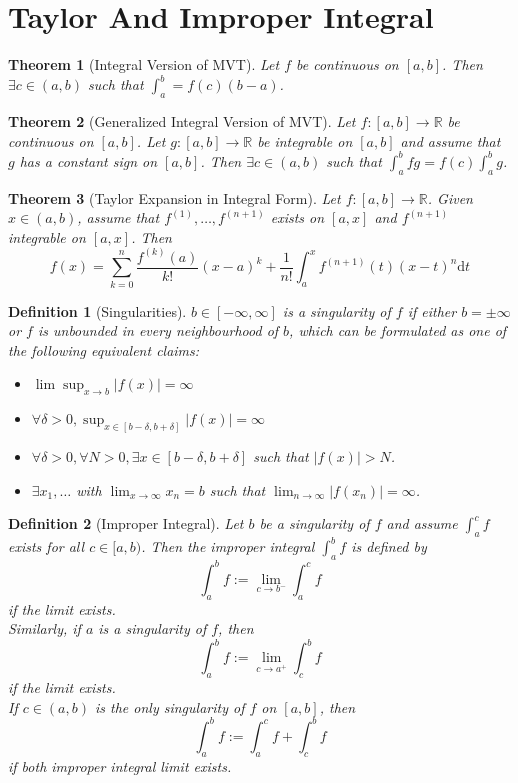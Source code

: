 \documentclass[12pt]{article}
\newcommand{\diff}{\mathrm{d}}
\newtheorem{definition}{Definition}[section]
\newtheorem{theorem}{Theorem}[section]
\theoremstyle{definition}
\begin{document}
\section{Taylor And Improper Integral}
\begin{theorem}[Integral Version of MVT]
\normalfont Let $f$ be continuous on $[a,b]$. Then $\exists c\in(a,b)$ such that $\int_a^b = f(c)(b-a)$.
\end{theorem}
\begin{theorem}[Generalized Integral Version of MVT]
\normalfont Let $f:[a,b]\to\mathbb{R}$ be continuous on $[a,b]$. Let $g:[a,b]\to\mathbb{R}$ be integrable on $[a,b]$ and assume that $g$ has a \textit{constant} sign on $[a,b]$. Then $\exists c\in(a,b)$ such that $\int_a^b fg=f(c)\int_a^b g$.
\end{theorem}
\begin{theorem}[Taylor Expansion in Integral Form]
\normalfont Let $f:[a,b]\to\mathbb{R}$. Given $x\in(a,b)$, assume that $f^{(1)}, \ldots, f^{(n+1)}$ exists on $[a,x]$ and $f^{(n+1)}$ integrable on $[a,x]$. Then
\[
f(x)=\sum_{k=0}^n \frac{f^{(k)}(a)}{k!}(x-a)^k + \frac{1}{n!}\int_a^x f^{(n+1)}(t)(x-t)^n\diff t
\]
\end{theorem}
\begin{definition}[Singularities]
\normalfont $b\in[-\infty, \infty]$ is a singularity of $f$ if either $b=\pm\infty$ or $f$ is unbounded in every neighbourhood of $b$, which can be formulated as one of the following equivalent claims:
\begin{itemize}
	\item $\lim\sup_{x\to b}|f(x)|=\infty$
	\item $\forall \delta>0, \sup_{x\in [b-\delta, b+\delta]} |f(x)|=\infty$
	\item $\forall \delta>0, \forall N>0, \exists x\in[b-\delta, b+\delta]$ such that $|f(x)|>N$.
	\item $\exists x_1,\ldots$ with $\lim_{x\to\infty} x_n=b$ such that $\lim_{n\to\infty}|f(x_n)|=\infty$.
\end{itemize}
\end{definition}
\begin{definition}[Improper Integral]
\normalfont Let $b$ be a singularity of $f$ and assume $\int_a^c f$ exists for all $c\in[a,b)$. Then the improper integral $\int_a^bf$ is defined by 
\[
\int_a^b f:=\lim_{c\to b^-}\int_a^c f
\]
if the limit exists.\\
Similarly, if $a$ is a singularity of $f$, then
\[
\int_a^b f:=\lim_{c\to a^+}\int_c^b f
\]
if the limit exists.\\
If $c\in(a,b)$ is the only singularity of $f$ on $[a,b]$, then
\[
\int_a^b f:=\int_a^c f+\int_c^bf
\]
if both improper integral limit exists.
\end{definition}
\end{document}
